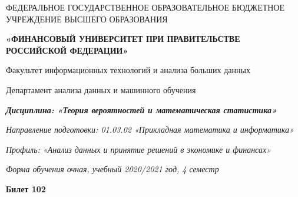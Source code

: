 \documentclass[a4paper,10pt]{article}
\begin{document}
\begin{center}
ФЕДЕРАЛЬНОЕ ГОСУДАРСТВЕННОЕ ОБРАЗОВАТЕЛЬНОЕ БЮДЖЕТНОЕ УЧРЕЖДЕНИЕ ВЫСШЕГО ОБРАЗОВАНИЯ

    \textbf{«ФИНАНСОВЫЙ УНИВЕРСИТЕТ ПРИ ПРАВИТЕЛЬСТВЕ РОССИЙСКОЙ ФЕДЕРАЦИИ»}

Факультет информационных технологий и анализа больших данных

Департамент анализа данных и машинного обучения

\textit{
	\textbf{Дисциплина: «Теория вероятностей и математическая статистика»}}

\textit{Направление подготовки: 01.03.02 «Прикладная математика и информатика»}

\textit{Профиль: «Анализ данных и принятие решений в экономике и финансах»}

\textit{Форма обучения очная, учебный 2020/2021 год, 4 семестр}

\textbf{Билет 102}

\end{center}
\end{document}
